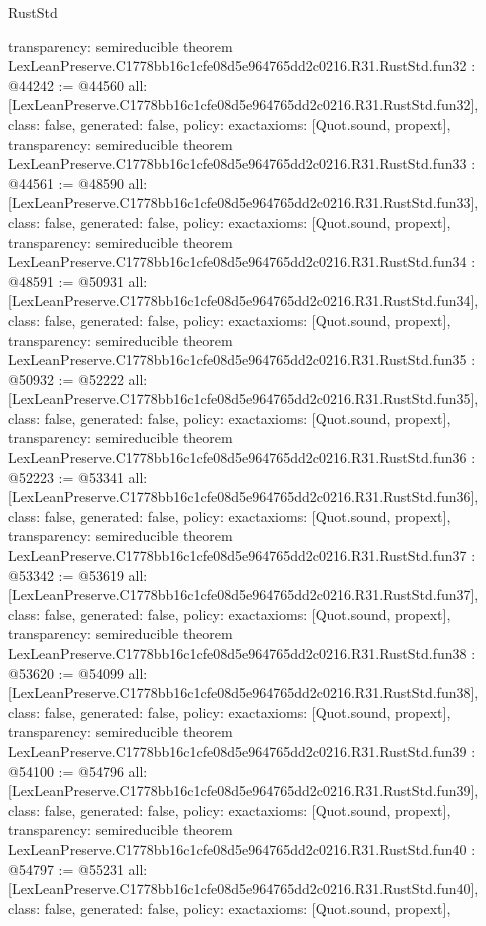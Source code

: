 \begin{lexlean}{RustStd}
\begin{coremodule}
{  transparency: semireducible
}
theorem LexLeanPreserve.C1778bb16c1cfe08d5e964765dd2c0216.R31.RustStd.fun32 : @44242 := @44560 {
  all: [LexLeanPreserve.C1778bb16c1cfe08d5e964765dd2c0216.R31.RustStd.fun32],
  class: false,
  generated: false,
  policy: exact{axioms: [Quot.sound, propext]},
  transparency: semireducible
}
theorem LexLeanPreserve.C1778bb16c1cfe08d5e964765dd2c0216.R31.RustStd.fun33 : @44561 := @48590 {
  all: [LexLeanPreserve.C1778bb16c1cfe08d5e964765dd2c0216.R31.RustStd.fun33],
  class: false,
  generated: false,
  policy: exact{axioms: [Quot.sound, propext]},
  transparency: semireducible
}
theorem LexLeanPreserve.C1778bb16c1cfe08d5e964765dd2c0216.R31.RustStd.fun34 : @48591 := @50931 {
  all: [LexLeanPreserve.C1778bb16c1cfe08d5e964765dd2c0216.R31.RustStd.fun34],
  class: false,
  generated: false,
  policy: exact{axioms: [Quot.sound, propext]},
  transparency: semireducible
}
theorem LexLeanPreserve.C1778bb16c1cfe08d5e964765dd2c0216.R31.RustStd.fun35 : @50932 := @52222 {
  all: [LexLeanPreserve.C1778bb16c1cfe08d5e964765dd2c0216.R31.RustStd.fun35],
  class: false,
  generated: false,
  policy: exact{axioms: [Quot.sound, propext]},
  transparency: semireducible
}
theorem LexLeanPreserve.C1778bb16c1cfe08d5e964765dd2c0216.R31.RustStd.fun36 : @52223 := @53341 {
  all: [LexLeanPreserve.C1778bb16c1cfe08d5e964765dd2c0216.R31.RustStd.fun36],
  class: false,
  generated: false,
  policy: exact{axioms: [Quot.sound, propext]},
  transparency: semireducible
}
theorem LexLeanPreserve.C1778bb16c1cfe08d5e964765dd2c0216.R31.RustStd.fun37 : @53342 := @53619 {
  all: [LexLeanPreserve.C1778bb16c1cfe08d5e964765dd2c0216.R31.RustStd.fun37],
  class: false,
  generated: false,
  policy: exact{axioms: [Quot.sound, propext]},
  transparency: semireducible
}
theorem LexLeanPreserve.C1778bb16c1cfe08d5e964765dd2c0216.R31.RustStd.fun38 : @53620 := @54099 {
  all: [LexLeanPreserve.C1778bb16c1cfe08d5e964765dd2c0216.R31.RustStd.fun38],
  class: false,
  generated: false,
  policy: exact{axioms: [Quot.sound, propext]},
  transparency: semireducible
}
theorem LexLeanPreserve.C1778bb16c1cfe08d5e964765dd2c0216.R31.RustStd.fun39 : @54100 := @54796 {
  all: [LexLeanPreserve.C1778bb16c1cfe08d5e964765dd2c0216.R31.RustStd.fun39],
  class: false,
  generated: false,
  policy: exact{axioms: [Quot.sound, propext]},
  transparency: semireducible
}
theorem LexLeanPreserve.C1778bb16c1cfe08d5e964765dd2c0216.R31.RustStd.fun40 : @54797 := @55231 {
  all: [LexLeanPreserve.C1778bb16c1cfe08d5e964765dd2c0216.R31.RustStd.fun40],
  class: false,
  generated: false,
  policy: exact{axioms: [Quot.sound, propext]},
}
\end{coremodule}
\end{lexlean}
